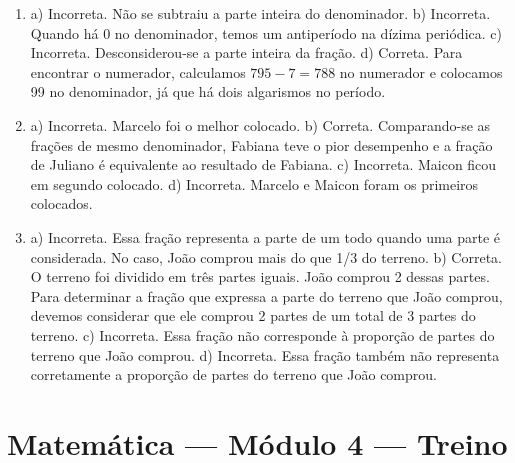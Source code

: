 \begin{enumerate}
\item a) Incorreta. Não se subtraiu a parte inteira do denominador.
b) Incorreta. Quando há 0 no denominador, temos um antiperíodo na dízima periódica.
c) Incorreta. Desconsiderou-se a parte inteira da fração.
d) Correta. Para encontrar o numerador, calculamos $795 - 7 = 788$ no numerador e colocamos 99 no denominador, já que há dois algarismos no período.

\item a) Incorreta. Marcelo foi o melhor colocado.
b) Correta. Comparando-se as frações de mesmo denominador, Fabiana teve o pior desempenho e a fração de Juliano é equivalente ao resultado de Fabiana.
c) Incorreta. Maicon ficou em segundo colocado.
d) Incorreta. Marcelo e Maicon foram os primeiros colocados.

\item a) Incorreta. Essa fração representa a parte de um todo quando uma
parte é considerada. No caso, João comprou mais do que 1/3 do terreno.
b) Correta. O terreno foi dividido em três partes iguais. João
comprou 2 dessas partes. Para determinar a fração que expressa a parte
do terreno que João comprou, devemos considerar que ele comprou 2 partes
de um total de 3 partes do terreno.
c) Incorreta. Essa fração não corresponde à proporção de partes do terreno que João comprou.
d) Incorreta. Essa fração também não representa corretamente a proporção de partes do terreno que João comprou.

\end{enumerate}


\section*{Matemática — Módulo 4 — Treino}

